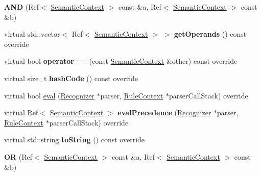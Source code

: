 \begin{DoxyCompactItemize}
{\bfseries A\+ND} (Ref$<$ \hyperlink{classantlr4_1_1atn_1_1SemanticContext}{Semantic\+Context} $>$ const \&a, Ref$<$ \hyperlink{classantlr4_1_1atn_1_1SemanticContext}{Semantic\+Context} $>$ const \&b)
\item 
\mbox{\label{classantlr4_1_1atn_1_1SemanticContext_ab1584465b3b88d7f75f030a24482fd13}} 
virtual std\+::vector$<$ Ref$<$ \hyperlink{classantlr4_1_1atn_1_1SemanticContext}{Semantic\+Context} $>$ $>$ {\bfseries get\+Operands} () const override
\item 
\mbox{\label{classantlr4_1_1atn_1_1SemanticContext_a1400e1ca84faec671a3756ff0b9f4734}} 
virtual bool {\bfseries operator==} (const \hyperlink{classantlr4_1_1atn_1_1SemanticContext}{Semantic\+Context} \&other) const override
\item 
\mbox{\label{classantlr4_1_1atn_1_1SemanticContext_a82a09a52cfc8030b1c33f1eaadad539a}} 
virtual size\+\_\+t {\bfseries hash\+Code} () const override
\item 
virtual bool \hyperlink{classantlr4_1_1atn_1_1SemanticContext_aaf020c5b73a8d0216f8423acd5d4cea8}{eval} (\hyperlink{classantlr4_1_1Recognizer}{Recognizer} $\ast$parser, \hyperlink{classantlr4_1_1RuleContext}{Rule\+Context} $\ast$parser\+Call\+Stack) override
\item 
\mbox{\label{classantlr4_1_1atn_1_1SemanticContext_a813c90739c89d03f17bf38ae5cbaa3dc}} 
virtual Ref$<$ \hyperlink{classantlr4_1_1atn_1_1SemanticContext}{Semantic\+Context} $>$ {\bfseries eval\+Precedence} (\hyperlink{classantlr4_1_1Recognizer}{Recognizer} $\ast$parser, \hyperlink{classantlr4_1_1RuleContext}{Rule\+Context} $\ast$parser\+Call\+Stack) override
\item 
\mbox{\label{classantlr4_1_1atn_1_1SemanticContext_a2a712638848af9bc2c996bda844eb15b}} 
virtual std\+::string {\bfseries to\+String} () const override
\item 
\mbox{\label{classantlr4_1_1atn_1_1SemanticContext_ace16c047124bb5e9fb62145e0b282a11}} 
{\bfseries OR} (Ref$<$ \hyperlink{classantlr4_1_1atn_1_1SemanticContext}{Semantic\+Context} $>$ const \&a, Ref$<$ \hyperlink{classantlr4_1_1atn_1_1SemanticContext}{Semantic\+Context} $>$ const \&b)

\end{DoxyCompactItemize}
